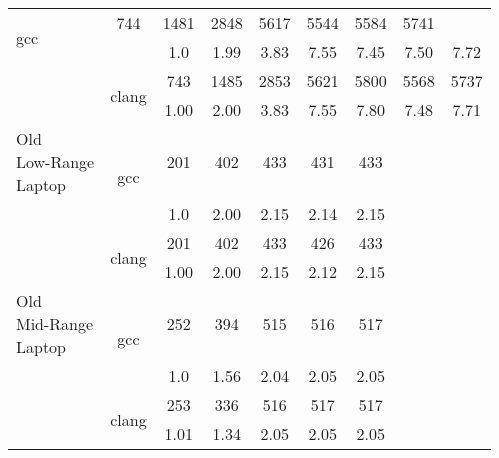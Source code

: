 \begin{table}
\begin{tabularx}{\linewidth}{X c c c c c c c c}
\multirow{2}{*}{gcc} & 744 & 1481 & 2848 & 5617 & 5544 & 5584 & 5741\\
 & & 1.0 & 1.99 & 3.83 & 7.55 & 7.45 & 7.50 & 7.72\\
\cmidrule[0.05em](){3-9} & 
\multirow{2}{*}{clang} & 743 & 1485 & 2853 & 5621 & 5800 & 5568 & 5737\\
 & & 1.00 & 2.00 & 3.83 & 7.55 & 7.80 & 7.48 & 7.71\\
            \midrule
\multirowcell{4}{Old\\ Low-Range\\ Laptop} & 
\multirow{2}{*}{gcc} & 201 & 402 & 433 & 431 & 433\\
 & & 1.0 & 2.00 & 2.15 & 2.14 & 2.15\\
\cmidrule[0.05em](){3-9} & 
\multirow{2}{*}{clang} & 201 & 402 & 433 & 426 & 433\\
 & & 1.00 & 2.00 & 2.15 & 2.12 & 2.15\\
            \midrule
\multirowcell{4}{Old\\ Mid-Range\\ Laptop} & 
\multirow{2}{*}{gcc} & 252 & 394 & 515 & 516 & 517\\
 & & 1.0 & 1.56 & 2.04 & 2.05 & 2.05\\
\cmidrule[0.05em](){3-9} & 
\multirow{2}{*}{clang} & 253 & 336 & 516 & 517 & 517\\
 & & 1.01 & 1.34 & 2.05 & 2.05 & 2.05 \\
            \bottomrule
        \end{tabularx}
    \end{table}
    